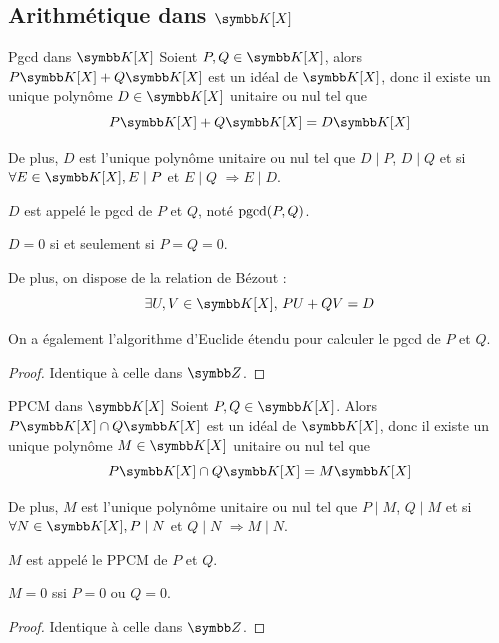 \subsection{Arithmétique dans \texorpdfstring{$\K [X]$}{K[X]}}

\begin{theoreme}{Pgcd dans $\K[X]$}{}
    Soient $P, Q \in \K[X]$, alors $P\K[X] + Q \K[X] $ est un idéal de $\K[X]$, 
    donc il existe un unique polynôme $D \in \K[X]$ unitaire ou nul tel que
    \[P \K[X] + Q \K[X] = D \K[X]\]

    De plus, $D$ est l'unique polynôme unitaire ou nul tel que 
    $D \mid P$, $D \mid Q$ et si $\forall E \in \K[X], E \mid P$ et $E \mid Q$ $\Rightarrow E \mid D$.

    $D$ est appelé le pgcd de $P$ et $Q$, noté $\operatorname{pgcd}(P, Q)$.
\end{theoreme}

\begin{remarque}
    $D = 0$ si et seulement si $P = Q = 0$.

    De plus, on dispose de la relation de Bézout :
    \[\exists U, V \in \K[X], \, PU + QV = D\]

    On a également l'algorithme d'Euclide étendu pour calculer le pgcd de $P$ et $Q$.
\end{remarque}

\begin{proof}
    Identique à celle dans $\Z$. 
\end{proof}

\begin{theoreme}{PPCM dans $\K[X]$}{}
    Soient $P, Q \in \K[X]$. Alors $P\K[X] \cap Q \K[X]$ est un idéal de 
    $\K[X]$, donc il existe un unique polynôme $M \in \K[X]$ unitaire ou nul tel que
    \[P \K[X] \cap Q \K[X] = M \K[X]\]

    De plus, $M$ est l'unique polynôme unitaire ou nul tel que
    $P \mid M$, $Q \mid M$ et si $\forall N \in \K[X], P \mid N$ et $Q \mid N$ $\Rightarrow M \mid N$.

    $M$ est appelé le PPCM de $P$ et $Q$. 
\end{theoreme}

\begin{remarque}
    $M = 0$ ssi $P = 0$ ou $Q = 0$.
\end{remarque}

\begin{proof}
    Identique à celle dans $\Z$.
\end{proof}

